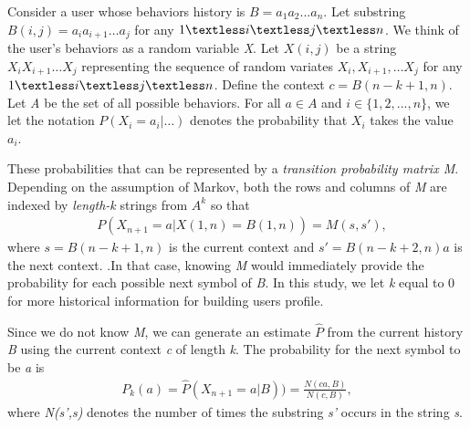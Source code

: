 \documentclass[conference]{IEEEtran}
\begin{document}
Consider a user whose behaviors history is \emph{$B = a_1a_2...a_n.$}
Let substring \emph{$B(i, j) = a_ia_{i+1}\ldots a_j$} for any \emph{$1 \textless i \textless j \textless n$}.
 We think of the user’s behaviors as a random variable \emph{X}. Let \emph{$X(i,j)$} be a string \emph{$X_iX_{i+1}\ldots X_j$} representing the sequence of random variates \emph{$X_i, X_{i+1},\ldots X_j$} for any \emph{$1\textless i \textless j \textless n$}. Define the context \emph{$c = B(n-k+1,n)$}. Let \emph{A} be the set of all possible behaviors. 
For all \emph{$a \in A $} and \emph{$i \in \{1,2,. . ., n\}$}, we let the notation \emph{$P(X_i = a_i|\ldots)$} denotes the probability that \emph{$X_i$} takes the value \emph{$a_i$}.

These probabilities that  can be represented by a \emph{transition
probability matrix M}. Depending on the assumption of Markov, both the rows and columns of \emph{M} are
indexed by \emph{length-k} strings from \emph{$A^k$} so that
\begin{align}
	&P(X_{n+1}=a|X(1,n)=B(1,n))=M(s,s'),
\end{align}
where \emph{$s = B(n-k+1,n)$} is the current context and \emph{$s'= B(n-k+2,n)a$} is the next context. .In that case, knowing \emph{M} would immediately provide the probability for each possible next symbol of \emph{B}. In this study, we let \emph{k} equal to 0 for more historical information for building users profile.

Since we do not know \emph{M}, we can generate an estimate \emph{$\hat P$} from the current history \emph{B} using the current context \emph{c} of length \emph{k}. The probability for the next symbol to be \emph{a} is
\begin{align}
	P_k(a)=\hat P(X_{n+1}=a|B))= \frac {N(ca,B)}{N(c,B)},
\end{align}
where \emph{N(s',s)} denotes the number of times the substring \emph{s'} occurs in the string \emph{s}.
\end{document}
